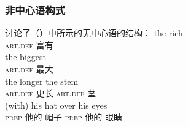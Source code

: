 %
\subsubsection{非中心语构式}
\label{sec-headless-constructions-dg}
%
 \citet[\S~4.E]{Hudson80a}讨论了（）中所示的无中心语的结构：
\eal
\ex 
\gll the rich\\
\textsc{art}.\textsc{def} 富有\\
\ex 
\gll the biggest\\
\textsc{art}.\textsc{def} 最大\\
\ex 
\gll the longer the stem\\
\textsc{art}.\textsc{def} 更长 \textsc{art}.\textsc{def} 茎\\
\ex 
\gll (with) his hat over his eyes\\
     \textsc{prep} 他的 帽子 \textsc{prep} 他的 眼睛\\
\zl
